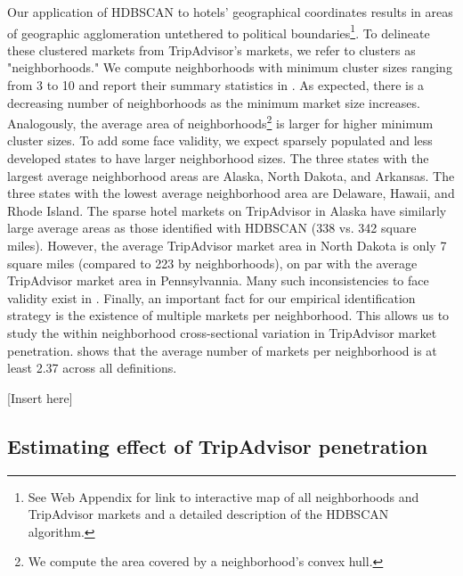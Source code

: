 \documentclass[mksc,blindrev]{informs3} %
\begin{document}
Our application of HDBSCAN to hotels' geographical coordinates results in areas of geographic agglomeration untethered to political boundaries\footnote{See Web Appendix for link to interactive map of all neighborhoods and TripAdvisor markets and a detailed description of the HDBSCAN algorithm.}. To delineate these clustered markets from TripAdvisor's markets, we refer to clusters as "neighborhoods." We compute neighborhoods with minimum cluster sizes ranging from 3 to 10 and report their summary statistics in . As expected, there is a decreasing number of neighborhoods as the minimum market size increases. Analogously, the average area of neighborhoods\footnote{We compute the area covered by a neighborhood's convex hull.} is larger for higher minimum cluster sizes. To add some face validity, we expect sparsely populated and less developed states to have larger neighborhood sizes. The three states with the largest average neighborhood areas are Alaska, North Dakota, and Arkansas. The three states with the lowest average neighborhood area are Delaware, Hawaii, and Rhode Island. The sparse hotel markets on TripAdvisor in Alaska have similarly large average areas as those identified with HDBSCAN (338 vs. 342 square miles). However, the average TripAdvisor market area in North Dakota is only 7 square miles (compared to 223 by neighborhoods), on par with the average TripAdvisor market area in Pennsylvannia. Many such inconsistencies to face validity exist in . Finally, an important fact for our empirical identification strategy is the existence of multiple markets per neighborhood. This allows us to study the within neighborhood cross-sectional variation in TripAdvisor market penetration.  shows that the average number of markets per neighborhood is at least 2.37 across all definitions.

[Insert  here]

\subsection{Estimating effect of TripAdvisor penetration}
\end{document}
